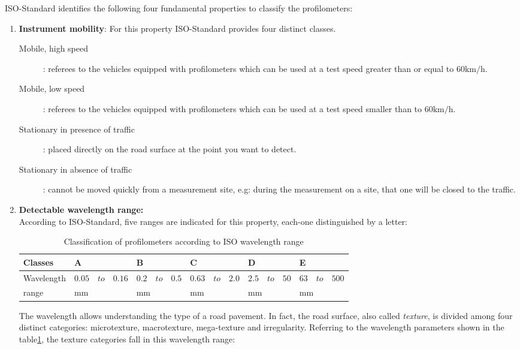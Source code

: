 \documentclass[tesi]{subfiles}
\begin{document}
ISO-Standard\cite{iso_standard} identifies the following four fundamental properties to classify the profilometers:
\begin{enumerate}

\item \textbf{Instrument mobility}: For this property ISO-Standard\cite{iso_standard} provides four distinct classes.
\begin{description}
\item [Mobile, high speed]: referees to the vehicles equipped with profilometers which can be used at a test speed greater than or equal to $\num{60} \si{\km\per\hour}$.
\item [Mobile, low speed]: referees to the vehicles equipped with profilometers which can be used at a test speed smaller than to $\num{60} \si{\km\per\hour}$.
\item [Stationary in presence of traffic]: placed directly on the road surface at the point you want to detect.
\item [Stationary in absence of traffic]: cannot be moved quickly from a measurement site, e.g: during the measurement on a site, that one will be closed to the traffic.
\end{description}
\clearpage
\item \textbf{Detectable wavelength range:}\\ According to ISO-Standard\cite{iso_standard}, five ranges are indicated for this property, each-one distinguished by a letter:

\vspace{0.5cm}
\begin{table}[H]
\centering
    \begin{tabular}{ | l | l | l | l | l | l |}

    \hline
    Classes &\quad A &\quad B &\quad C &\quad D &\quad E \\ \hline
    Wavelength &	$ 0.05 \quad to \quad 0.16$&	$ 0.2 \quad to \quad 0.5$&		$0.63 \quad to \quad 2.0$&	$2.5 \quad to \quad 50$&	$63 \quad to \quad 500$\\
    \quad range &\quad $\si{\milli\meter}$ &\quad  $\si{\milli\meter}$ &\quad  $\si{\milli\meter}$ &\quad  $\si{\milli\meter}$ &\quad  $\si{\milli\meter}$ \\
\hline
    \end{tabular}
 \caption{Classification of profilometers according to ISO wavelength range}
 \label{table:iso_wave}
\end{table}

The wavelength allows understanding the type of a road pavement. In fact, the road surface, also called \textit{texture}, is divided among four distinct categories: microtexture, macrotexture, mega-texture and irregularity. Referring to the wavelength parameters shown in the table\ref{table:iso_wave}, the texture categories fall in this wavelength range\cite{sayers1996interpretation}:
\vspace{0.5cm}
\begin{table}[H]
\centering
    \begin{tabular}{ | l | l | l | l | l |}


\end{tabular}
\end{table}
\end{enumerate}
\end{document}
